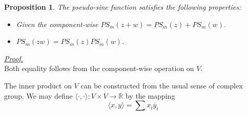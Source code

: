 \documentclass[12pt]{article}
\newcommand{\innerprod}[2]{\langle{#1},{#2}\rangle}
\newtheorem*{proposition}{Proposition}
\renewenvironment{proof}[1][Proof]{\begin{snugshade*} \underline{\textit{{#1}.}}\\}{\hfill \qedsymbol \end{snugshade*}}
\begin{document}
    \begin{proposition}
        The pseudo-sine function satisfies the following properties:
        \begin{itemize}
            \item Given the component-wise $PS_m(z+w)=PS_m(z)+PS_m(w)$.
            \item $PS_m(zw)=PS_m(z)PS_m(w)$.
        \end{itemize}
    \end{proposition}

    \begin{proof}
        Both equality follows from the component-wise operation on $V$.
    \end{proof}

    The inner product on $V$ can be constructed from the usual sense of complex group. We may define $\innerprod{\cdot}{\cdot}:V\times V\to\mathbb{R}$ by the mapping \[\innerprod{x}{y}=\sum x_i \overline{y}_i\]
\end{document}
